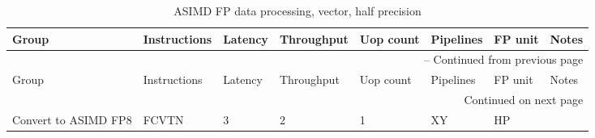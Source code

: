 \newpage
\begin{longtable}{|p{1in}|p{1in}|l|l|l|p{1in}|l|p{1in}|}
\caption{ASIMD FP data processing, vector, half precision} \\
\hline
Group & Instructions & Latency & Throughput & Uop count & Pipelines & FP unit & Notes\\
\hline
\endfirsthead
\hline
\multicolumn{8}{|r|}{{\tablename\ \thetable{} -- Continued from previous page}} \\
\hline
Group & Instructions & Latency & Throughput & Uop count & Pipelines & FP unit & Notes\\
\hline
\endhead
\hline
\multicolumn{8}{|r|}{{Continued on next page}} \\
\hline
\endfoot
\hline
\endlastfoot
Convert to ASIMD FP8 & FCVTN & 3 & 2 & 1 & XY & HP & \\
\hline
\end{longtable}
\newpage
